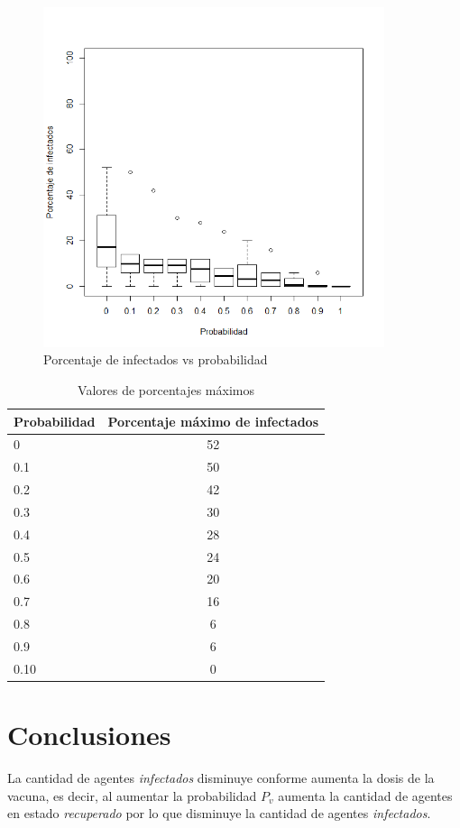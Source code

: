 \documentclass{article}
\begin{document}
\begin{figure}[!h]
\centering\includegraphics[width=100mm]{p6v2.png}
\caption{Porcentaje de infectados vs probabilidad}
\label{p6}
\end{figure}

\begin{table}[h!]
\caption{Valores de porcentajes máximos}
\label{pormax}
\vspace*{3mm}
\centering
\begin{tabular}{l|c} 
Probabilidad & Porcentaje máximo de infectados \\  \hline
0 & 52 \\
0.1 &  50 \\
0.2 & 42 \\
0.3 & 30 \\
0.4 & 28 \\
0.5 & 24 \\
0.6 & 20 \\
0.7 & 16 \\
0.8 & 6 \\
0.9 & 6 \\
0.10 & 0 \\
\end{tabular}
\end{table}

\newpage

\section{Conclusiones}

La cantidad de agentes \textit{infectados} disminuye conforme aumenta la dosis de la vacuna, es decir, al aumentar la probabilidad $P_{v}$ aumenta la cantidad de agentes en estado \textit{recuperado} por lo que disminuye la cantidad de agentes \textit{infectados}.



\end{document}
